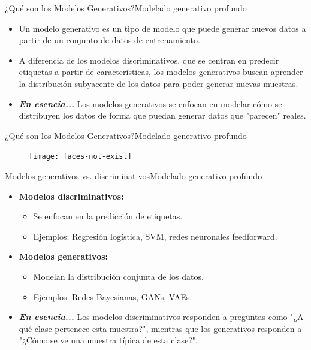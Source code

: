 \documentclass[10pt,border=3pt,tikz]{beamer}
\begin{document}
    \begin{frame}{¿Qué son los Modelos Generativos?}{Modelado generativo profundo}
        \begin{itemize}
            \item Un modelo generativo es un tipo de modelo que puede generar nuevos datos a partir de un conjunto de datos de entrenamiento.
            \item A diferencia de los modelos discriminativos, que se centran en predecir etiquetas a partir de características, los modelos generativos buscan aprender la distribución subyacente de los datos para poder generar nuevas muestras.
            \item \textbf{\textit{En esencia...}} Los modelos generativos se enfocan en modelar cómo se distribuyen los datos de forma que puedan generar datos que "parecen" reales.
        \end{itemize}
    \end{frame}
    
    \begin{frame}{¿Qué son los Modelos Generativos?}{Modelado generativo profundo}
        \begin{figure}
            \centering
            \texttt{[image: faces-not-exist]}
        \end{figure}
    \end{frame}
    
    \begin{frame}{Modelos generativos vs. discriminativos}{Modelado generativo profundo}
        \begin{itemize}
            \item \textbf{Modelos discriminativos:}
            \begin{itemize}
                \item Se enfocan en la predicción de etiquetas.
                \item Ejemplos: Regresión logística, SVM, redes neuronales feedforward.
            \end{itemize}
            \item \textbf{Modelos generativos:}
            \begin{itemize}
                \item Modelan la distribución conjunta de los datos.
                \item Ejemplos: Redes Bayesianas, GANs, VAEs.
            \end{itemize}
            \item \textbf{\textit{En esencia...}} Los modelos discriminativos responden a preguntas como "¿A qué clase pertenece esta muestra?", mientras que los generativos responden a "¿Cómo se ve una muestra típica de esta clase?".
        \end{itemize}
    \end{frame}
    
\end{document}
